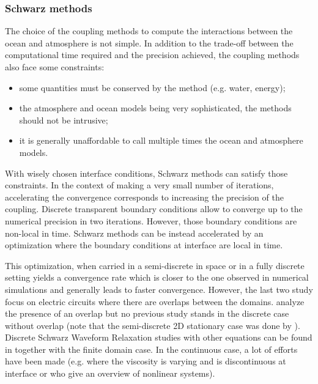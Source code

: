 \subsubsection*{Schwarz methods}
The choice of the coupling methods to compute the interactions
between the ocean and atmosphere is not simple.
In addition to the trade-off between the computational time required and
the precision achieved, the coupling methods
also face some constraints:
\begin{itemize}
	\item some quantities must be conserved by the method
		(e.g. water, energy);
	\item the atmosphere and ocean models being very
		sophisticated, the methods should not be intrusive;
	\item it is generally unaffordable to call multiple times
		the ocean and atmosphere models.
\end{itemize}
With wisely chosen interface conditions, Schwarz methods can
satisfy those constraints. In the context of making a very
small number of iterations, accelerating the convergence
corresponds to increasing the precision of the coupling.
Discrete transparent boundary conditions
\citep{zisowsky_discrete_2006} allow to converge up to the
numerical precision in two iterations.
However, those boundary conditions are non-local in time.
Schwarz methods can be instead accelerated
by an optimization \citep{gander_optimized_2006} where
the boundary conditions at interface are local in time.
\par
This optimization, when carried in a semi-discrete in space
\citep{wu_semi-discrete_2014-1} or in a fully discrete setting
\citep{wu_optimized_2017-2} yields a convergence rate which is
closer to the one observed in numerical simulations and
generally leads to faster convergence.
However, the last two study focus on electric circuits where
there are overlaps between the domains. \citep{gander_analysis_2018}
analyze the presence of an overlap but no previous study
stands in the discrete case without overlap (note that the
semi-discrete 2D stationary case was done by
\citep{gerardo-giorda_optimized_2005}).
Discrete Schwarz Waveform Relaxation studies with other equations
can be found in \citep{haynes_fully_2020} together with
the finite domain case.
In the continuous case, a lot of efforts have been made
(e.g. \citep{thery_analysis_2021} where the viscosity
is varying and is discontinuous at interface or
\citep{haberlein_optimized_2014} who give an overview of
nonlinear systems).
\par
